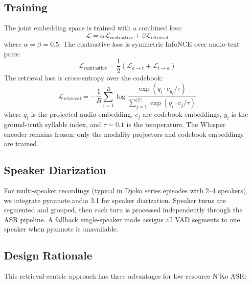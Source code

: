 \documentclass[11pt]{article}
\begin{document}
\subsection{Training}

The joint embedding space is trained with a combined loss:
\begin{equation}
\mathcal{L} = \alpha \mathcal{L}_\text{contrastive} + \beta \mathcal{L}_\text{retrieval}
\end{equation}
where $\alpha = \beta = 0.5$. The contrastive loss is symmetric InfoNCE over audio-text pairs:
\begin{equation}
\mathcal{L}_\text{contrastive} = \frac{1}{2}\left(\mathcal{L}_{a \to t} + \mathcal{L}_{t \to a}\right)
\end{equation}
The retrieval loss is cross-entropy over the codebook:
\begin{equation}
\mathcal{L}_\text{retrieval} = -\frac{1}{B}\sum_{i=1}^{B} \log \frac{\exp(q_i \cdot c_{y_i} / \tau)}{\sum_{j=1}^{|\mathcal{C}|}\exp(q_i \cdot c_j / \tau)}
\end{equation}
where $q_i$ is the projected audio embedding, $c_j$ are codebook embeddings, $y_i$ is the ground-truth syllable index, and $\tau = 0.1$ is the temperature. The Whisper encoder remains frozen; only the modality projectors and codebook embeddings are trained.

\subsection{Speaker Diarization}

For multi-speaker recordings (typical in Djoko series episodes with 2--4 speakers), we integrate pyannote.audio 3.1 for speaker diarization. Speaker turns are segmented and grouped, then each turn is processed independently through the ASR pipeline. A fallback single-speaker mode assigns all VAD segments to one speaker when pyannote is unavailable.

\subsection{Design Rationale}

This retrieval-centric approach has three advantages for low-resource N'Ko ASR:
\end{document}

